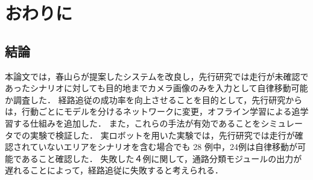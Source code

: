 \chapter{おわりに}
\label{chap:end}
\section{結論}
本論文では，春山らが提案したシステムを改良し，先行研究では走行が未確認であったシナリオに対しても目的地までカメラ画像のみを入力として自律移動可能か調査した．
経路追従の成功率を向上させることを目的として，先行研究からは，行動ごとにモデルを分けるネットワークに変更，オフライン学習による追学習する仕組みを追加した．
また，これらの手法が有効であることをシミュレータでの実験で検証した．
実ロボットを用いた実験では，先行研究では走行が確認されていないエリアをシナリオを含む場合でも 28 例中，24例は自律移動が可能であること確認した．
失敗した４例に関して，通路分類モジュールの出力が遅れることによって，経路追従に失敗すると考えられる．